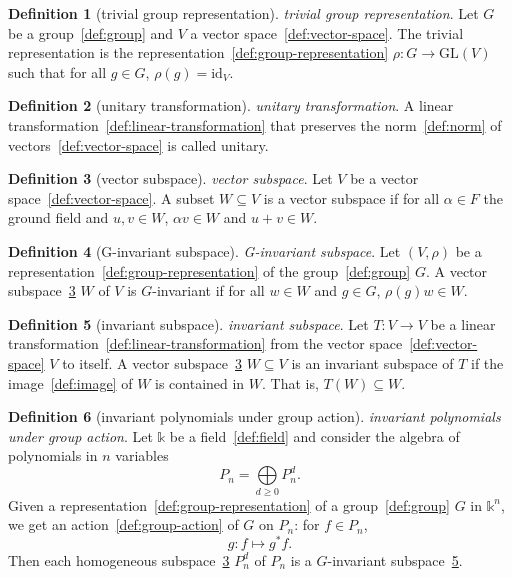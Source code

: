 \documentclass[12pt,a4paper]{article}
\theoremstyle{definition}
\newtheorem{definition}{Definition}
\begin{document}
\begin{definition}[trivial group representation]\label{def:trivial-group-representation}
\emph{trivial group representation}. Let $G$ be a group~\ref{def:group} and $V$ a vector space~\ref{def:vector-space}. The trivial representation is the representation~\ref{def:group-representation} $\rho: G\to \text{GL}(V)$ such that for all $g\in G$, $\rho(g) = \text{id}_V$.
\end{definition}

\begin{definition}[unitary transformation]\label{def:unitary-transformation}
\emph{unitary transformation}. A linear transformation~\ref{def:linear-transformation} that preserves the norm~\ref{def:norm} of vectors~\ref{def:vector-space} is called unitary.
\end{definition}

\begin{definition}[vector subspace]\label{def:vector-subspace}
\emph{vector subspace}. Let $V$ be a vector space~\ref{def:vector-space}. A subset $W \subseteq V$ is a vector subspace if for all $\alpha \in F$ the ground field and $u,v \in W$, $\alpha v \in W$ and $u+v \in W$.
\end{definition}

\begin{definition}[G-invariant subspace]\label{def:g-invariant-subspace}
\emph{G-invariant subspace}. Let $(V,\rho)$ be a representation~\ref{def:group-representation} of the group~\ref{def:group} $G$.  A vector subspace~\ref{def:vector-subspace} $W$ of $V$ is $G$-invariant if for all $w\in W$ and $g\in G$, $\rho(g)w \in W$.
\end{definition}

\begin{definition}[invariant subspace]\label{def:invariant-subspace}
\emph{invariant subspace}. Let $T: V\to V$ be a linear transformation~\ref{def:linear-transformation} from the vector space~\ref{def:vector-space} $V$ to itself. A vector subspace~\ref{def:vector-subspace} $W\subseteq V$ is an invariant subspace of $T$ if the image~\ref{def:image} of $W$ is contained in $W$. That is, $T(W)\subseteq W$.
\end{definition}

\begin{definition}[invariant polynomials under group action]\label{def:invariant-polynomials-under-group-action}
\emph{invariant polynomials under group action}. Let $\mathbb k$ be a field~\ref{def:field} and consider the algebra of polynomials in $n$ variables $$P_n =\bigoplus\limits_{d\geq 0} P_n^d.$$ Given a representation~\ref{def:group-representation} of a group~\ref{def:group} $G$ in $\mathbb k^n$, we get an action~\ref{def:group-action} of $G$ on $P_n$: for $f\in P_n$, $$g:f\mapsto g^*f.$$ Then each homogeneous subspace~\ref{def:vector-subspace} $P_n^d$ of $P_n$ is a $G$-invariant subspace~\ref{def:invariant-subspace}.
\end{definition}
\end{document}
